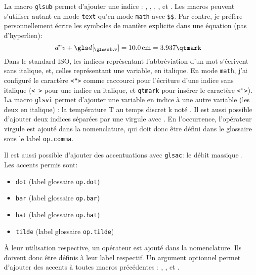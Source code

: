 \documentclass[PhD,nohyperref,english,french]{ulthese}
\begin{document}
La macro \texttt{glsub} permet d'ajouter une indice : , , , ,  et . Les macros peuvent s'utiliser autant en mode \texttt{text} qu'en mode \texttt{math} avec \texttt{\$\$}. Par contre, je préfère personnellement écrire les symboles de manière explicite dans une équation (pas d'hyperlien):
\begin{equation}
d"v + \glsub{d}{v} = \SI{10.0}{\centi\meter} = 3.937\qtmark
\end{equation}
Dans le standard ISO, les indices représentant l'abbréviation d'un mot s'écrivent sans italique, et, celles représentant une variable, en italique. En mode \texttt{math}, j'ai configuré le caractère \texttt{<">} comme raccourci pour l'écriture d'une indice sans italique (\texttt{<\_>} pour une indice en italique, et \texttt{qtmark} pour insérer le caractère \texttt{<">}). La macro \texttt{glsvi} permet d'ajouter une variable en indice à une autre variable (les deux en italique) : la température \gls{T} au temps discret \gls{k} noté . Il est aussi possible d'ajouter deux indices séparées par une virgule avec . En l’occurrence, l'opérateur virgule est ajouté dans la nomenclature, qui doit donc être défini dans le glossaire sous le label \texttt{op.comma}.

Il est aussi possible d'ajouter des accentuations avec \texttt{glsac}: le débit massique 
. Les accents permis sont:
\begin{itemize} 
	\item \texttt{dot} (label glossaire \texttt{op.dot})
	\item \texttt{bar} (label glossaire \texttt{op.bar})
	\item \texttt{hat} (label glossaire \texttt{op.hat})
	\item \texttt{tilde} (label glossaire \texttt{op.tilde})
\end{itemize}
À leur utilisation respective, un opérateur est ajouté dans la nomenclature. Ils doivent donc être définis à leur label respectif. Un argument optionnel permet d'ajouter des accents à toutes macros précédentes : , ,  et .
\end{document}

